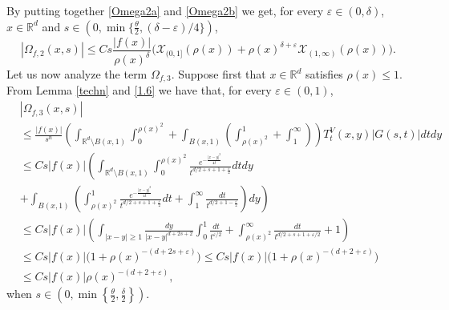 \documentclass[10pt, a4paper, reqno]{amsart}
\theoremstyle{definition}
\theoremstyle{remark}
\numberwithin{equation}{section}
\begin{document}
By putting together \eqref{Omega2a} and \eqref{Omega2b} we get, for every $\varepsilon \in (0,\delta)$, $x\in \mathbb R^d$ and $s\in (0,\min\{\tfrac{\theta}{2},(\delta-\varepsilon)/4\})$,
\begin{equation}\label{Omega2}
|\Omega_{f,2}(x,s)|\leq Cs\frac{|f(x)|}{\rho (x)^\delta}\Big(\mathcal X_{(0,1]}(\rho (x))+\rho (x)^{\delta+\varepsilon}\mathcal X_{(1,\infty )}(\rho (x)) \Big).
\end{equation}
Let us now analyze the term $\Omega_{f,3}$. Suppose first that $x\in \mathbb R^d$ satisfies $\rho (x)\leq 1$.
From Lemma \ref{techn} and \eqref{1.6} we have that, for every $\varepsilon \in (0,1)$,
\begin{align*}
 &|\Omega_{f,3}(x,s)|\\
 &\leq \frac{|f(x)|}{s^n}\left(\int_{\mathbb R^d\setminus B(x,1)}\int_0^{\rho (x)^2} +\int_{B(x,1)}\left(\int_{\rho (x)^2}^1+\int_1^\infty\right)\right)T_t^V(x,y)|G(s,t)|dtdy\\
    &\leq Cs|f(x)|\left(\int_{\mathbb R^d\setminus B(x,1)}\int_0^{\rho (x)^2}\frac{e^{-\frac{|x-y|^2}{4t}}}{t^{d/2+s+1+\tfrac{\varepsilon}{2}}}dtdy\right.\\
    &\left.+\int_{B(x,1)}\left(\int_{\rho (x)^2}^1\frac{e^{-\frac{|x-y|^2}{4t}}}{t^{d/2+s+1+\tfrac{\varepsilon}{2}}}dt+\int_1^\infty \frac{dt}{t^{d/2+1-\tfrac{\varepsilon}{2}}}\right)dy\right)\\
    &\leq Cs|f(x)|\left(\int_{|x-y|\geq 1}\frac{dy}{|x-y|^{d+2s+2}}\int_0^1\frac{dt}{t^{\varepsilon /2}}+\int_{\rho (x)^2}^\infty\frac{dt}{t^{d/2+s+1+\varepsilon /2}}+1\right)\\
    &\leq Cs|f(x)|\Big(1+\rho (x)^{-(d
    +2s+\varepsilon)}\Big)\leq Cs|f(x)|\Big(1+\rho (x)^{-(d+2+\varepsilon)}\Big)\\
    &\leq Cs|f(x)|\rho (x)^{-(d+2+\varepsilon)}, 
\end{align*}
when $s\in (0,\min\left\{\tfrac{\theta}{2},\tfrac{\delta}{2}\right\})$. 
\end{document}
